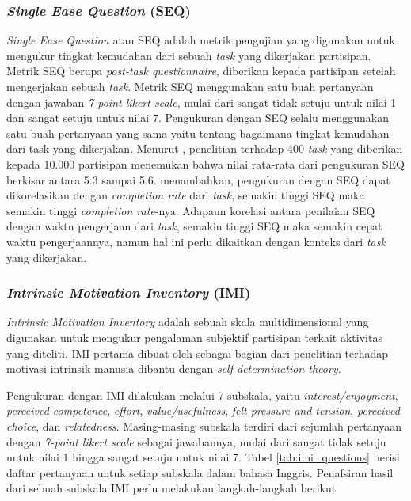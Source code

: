 \subsubsection{\textit{Single Ease Question} (SEQ)}
\label{subsubsec:seq}
\textit{Single Ease Question} atau SEQ adalah metrik pengujian yang digunakan untuk mengukur tingkat kemudahan dari sebuah \textit{task} yang dikerjakan partisipan. Metrik SEQ berupa \textit{post-task questionnaire}, diberikan kepada partisipan setelah mengerjakan sebuah \textit{task}. Metrik SEQ menggunakan satu buah pertanyaan dengan jawaban \textit{7-point likert scale}, mulai dari sangat tidak setuju untuk nilai 1 dan sangat setuju untuk nilai 7. Pengukuran dengan SEQ selalu menggunakan satu buah pertanyaan yang sama yaitu tentang bagaimana tingkat kemudahan dari task yang dikerjakan. Menurut \textcite{seq2012sauro}, penelitian terhadap 400 \textit{task} yang diberikan kepada 10.000 partisipan menemukan bahwa nilai rata-rata dari pengukuran SEQ berkisar antara 5.3 sampai 5.6. \textcite{seq2018sauro} menambahkan, pengukuran dengan SEQ dapat dikorelasikan dengan \textit{completion rate} dari \textit{task}, semakin tinggi SEQ maka semakin tinggi \textit{completion rate}-nya. Adapaun korelasi antara penilaian SEQ dengan waktu pengerjaan dari \textit{task}, semakin tinggi SEQ maka semakin cepat waktu pengerjaannya, namun hal ini perlu dikaitkan dengan konteks dari \textit{task} yang dikerjakan.

\subsubsection{\textit{Intrinsic Motivation Inventory} (IMI)}
\label{subsubsec:imi}
\textit{Intrinsic Motivation Inventory} adalah sebuah skala multidimensional yang digunakan untuk mengukur pengalaman subjektif partisipan terkait aktivitas yang diteliti. \parencite{imisdtorg} IMI pertama dibuat oleh \textcite{RYANDECI2000SDT} sebagai bagian dari penelitian terhadap motivasi intrinsik manusia dibantu dengan \textit{self-determination theory}.

Pengukuran dengan IMI dilakukan melalui 7 subskala, yaitu \textit{interest/enjoyment}, \textit{perceived competence}, \textit{effort}, \textit{value/usefulness}, \textit{felt pressure and tension}, \textit{perceived choice}, dan \textit{relatedness}. Masing-masing subskala terdiri dari sejumlah pertanyaan dengan \textit{7-point likert scale} sebagai jawabannya, mulai dari sangat tidak setuju untuk nilai 1 hingga sangat setuju untuk nilai 7. Tabel \ref{tab:imi_questions} berisi daftar pertanyaan untuk setiap subskala dalam bahasa Inggris. Penafsiran hasil dari sebuah subskala IMI perlu melakukan langkah-langkah berikut


